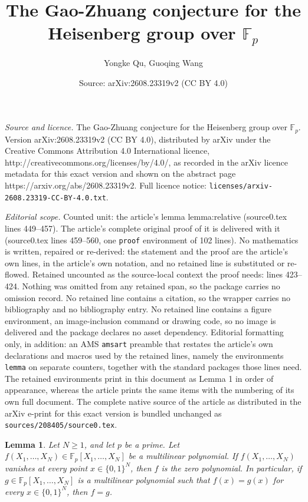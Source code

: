 \documentclass[10pt,a4paper]{amsart}
\title{The Gao-Zhuang conjecture for the Heisenberg group over $\mathbb{F}_p$}
\author{Yongke Qu, Guoqing Wang}
\date{Source: arXiv:2608.23319v2 (CC BY 4.0)}
\newtheorem{lemma}{Lemma}
\begin{document}
\maketitle

\noindent\emph{Source and licence.} The Gao-Zhuang conjecture for the Heisenberg group over $\mathbb{F}_p$. Version arXiv:2608.23319v2 (CC BY 4.0), distributed by arXiv under the Creative Commons Attribution 4.0 International licence, http://creativecommons.org/licenses/by/4.0/, as recorded in the arXiv licence metadata for this exact version and shown on the abstract page https://arxiv.org/abs/2608.23319v2. Full licence notice: \texttt{licenses/arxiv-2608.23319-CC-BY-4.0.txt}.\par\smallskip

\noindent\textit{Editorial scope.} Counted unit: the article's lemma lemma:relative (source0.tex lines 449--457). The article's complete original proof of it is delivered with it (source0.tex lines 459--560, one \texttt{proof} environment of 102 lines). No mathematics is written, repaired or re-derived: the statement and the proof are the article's own lines, in the article's own notation, and no retained line is substituted or re-flowed.  Retained uncounted as the source-local context the proof needs: lines 423--424.  Nothing was omitted from any retained span, so the package carries no omission record.  No retained line contains a citation, so the wrapper carries no bibliography and no bibliography entry.  No retained line contains a figure environment, an image-inclusion command or drawing code, so no image is delivered and the package declares no asset dependency.  Editorial formatting only, in addition: an AMS \texttt{amsart} preamble that restates the article's own declarations and macros used by the retained lines, namely the environments \texttt{lemma} on separate counters, together with the standard packages those lines need.  The retained environments print in this document as Lemma 1 in order of appearance, whereas the article prints the same items with the numbering of its own full document.  The complete native source of the article as distributed in the arXiv e-print for this exact version is bundled unchanged as \texttt{sources/208405/source0.tex}.
\begin{lemma}\label{lemma:multilinearreduction} Let $N\ge 1$, and let $p$ be a prime. Let $f(X_1,\ldots,X_N)\in \mathbb{F}_p[X_1,\ldots,X_N]$ be a multilinear polynomial. If $f(X_1,\ldots,X_N)$ vanishes at every point $x\in\{0,1\}^N$, then $f$ is the zero polynomial. In particular, if $g\in \mathbb{F}_p[X_1,\ldots,X_N]$ is a multilinear polynomial such that $f(x)=g(x)$ for every $x\in\{0,1\}^N$, then $f=g$.
\end{lemma}
\end{document}
